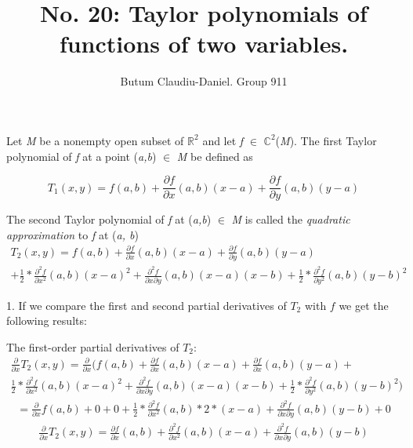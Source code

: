 \documentclass[a4paper,12pt]{article}
\begin{document}
\title{No. 20: Taylor polynomials of functions of two variables.}
\author{Butum Claudiu-Daniel. Group 911}
\maketitle

Let \emph{M} be a nonempty open  subset of $\mathbb{R}^2$ and let
\emph{f} $\in$ $\mathbb{C}^2$(\emph{M}). \newline
The first Taylor polynomial of \emph{f} at a point 
(\emph{a,b}) $\in$ \emph{M} be defined as 

\[ T_{1}(x,y) =  
	f(a, b) + 
	\frac{\partial f}{\partial x}(a, b)(x - a) + 
	\frac{\partial f}{\partial y}(a, b)(y - a) \]

The second Taylor polynomial of \emph{f} at (\emph{a,b}) $\in$ \emph{M}
is called the \emph{quadratic approximation} to \emph{f} at (\emph{a, b})
\begin{multline*}
T_{2}(x,y) =  
	f(a, b) + 
	\frac{\partial f}{\partial x}(a, b)(x - a) + 
	\frac{\partial f}{\partial y}(a, b)(y - a) \\ +
	\frac{1}{2} * \frac{\partial^2 f}{\partial x^2}(a, b)(x - a)^2 +
	\frac{\partial^2 f}{\partial x\partial y}(a, b)(x - a)(x - b) +
	\frac{1}{2} * \frac{\partial^2 f}{\partial y^2}(a, b)(y - b)^2
\end{multline*}

\vspace{1cm} 
1. If we compare the first and second partial derivatives of $T_{2}$ with $f$ we get the following results: 

The first-order partial derivatives of $T_{2}$:
\begin{multline*}
\frac{\partial }{\partial x} T_{2}(x,y) =  
    \frac{\partial }{\partial x} 
    (
    f(a, b) + 
	\frac{\partial f}{\partial x}(a, b)(x - a) + 
	\frac{\partial f}{\partial x}(a, b)(y - a) + \\
	\frac{1}{2} * \frac{\partial^2 f}{\partial x^2}(a, b)(x - a)^2 +
	\frac{\partial^2 f}{\partial x\partial y}(a, b)(x - a)(x - b) +
	\frac{1}{2} * \frac{\partial^2 f}{\partial y^2}(a, b)(y - b)^2 
	)
\end{multline*}
\begin{multline*}
=  
    \frac{\partial }{\partial x} f(a, b) + 
	0 + 
	0 + 
	\frac{1}{2} * \frac{\partial^2 f}{\partial x^2}(a, b)*2*(x - a) +
	\frac{\partial^2 f}{\partial x\partial y}(a, b)(y - b) +
	0
\end{multline*}
\begin{multline*}
\frac{\partial }{\partial x} T_{2}(x,y) =  
    \frac{\partial f}{\partial x}(a, b) + 
    \frac{\partial^2 f}{\partial x^2}(a, b)(x - a) +
	\frac{\partial^2 f}{\partial x\partial y}(a, b)(y - b)
\end{multline*}
\end{document}
